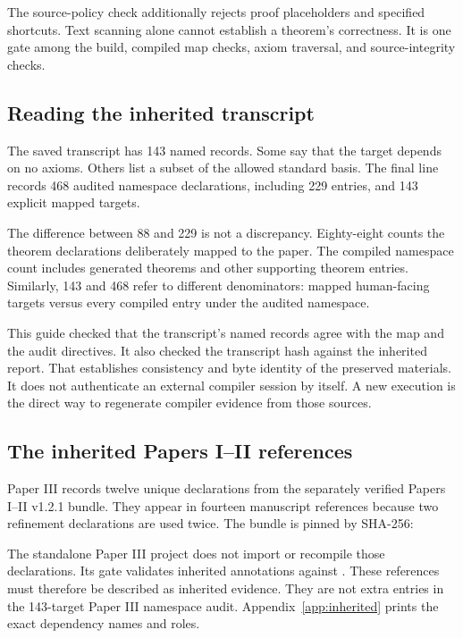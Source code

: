 The source-policy check additionally rejects proof placeholders and specified shortcuts. Text scanning alone cannot establish a theorem's correctness. It is one gate among the build, compiled map checks, axiom traversal, and source-integrity checks.

\subsection{Reading the inherited transcript}
The saved transcript has 143 named records. Some say that the target depends on no axioms. Others list a subset of the allowed standard basis. The final line records 468 audited namespace declarations, including 229  entries, and 143 explicit mapped targets.

The difference between 88 and 229 is not a discrepancy. Eighty-eight counts the theorem declarations deliberately mapped to the paper. The compiled namespace count includes generated theorems and other supporting theorem entries. Similarly, 143 and 468 refer to different denominators: mapped human-facing targets versus every compiled entry under the audited namespace.

This guide checked that the transcript's named records agree with the map and the audit directives. It also checked the transcript hash against the inherited report. That establishes consistency and byte identity of the preserved materials. It does not authenticate an external compiler session by itself. A new execution is the direct way to regenerate compiler evidence from those sources.

\subsection{The inherited Papers I--II references}
Paper III records twelve unique declarations from the separately verified Papers I--II v1.2.1 bundle. They appear in fourteen manuscript references because two refinement declarations are used twice. The bundle is pinned by SHA-256:

{\small{}}

The standalone Paper III project does not import or recompile those declarations. Its gate validates inherited annotations against . These references must therefore be described as inherited evidence. They are not extra entries in the 143-target Paper III namespace audit. Appendix~\ref{app:inherited} prints the exact dependency names and roles.

